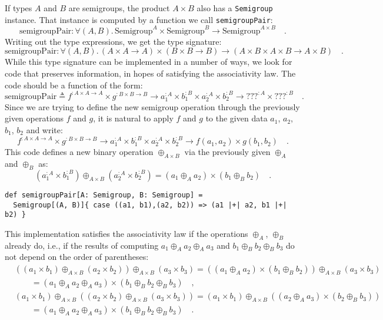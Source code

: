 If types $A$ and $B$ are semigroups, the product $A\times B$ also
has a \lstinline!Semigroup! instance. That instance is computed by
a function we call \lstinline!semigroupPair!:
\[
\text{semigroupPair}:\forall(A,B).\,\text{Semigroup}^{A}\times\text{Semigroup}^{B}\rightarrow\text{Semigroup}^{A\times B}\quad.
\]
Writing out the type expressions, we get the type signature:
\[
\text{semigroupPair}:\forall(A,B).\,\left(A\times A\rightarrow A\right)\times\left(B\times B\rightarrow B\right)\rightarrow\left(A\times B\times A\times B\rightarrow A\times B\right)\quad.
\]
While this type signature can be implemented in a number of ways,
we look for code that preserves information, in hopes of satisfying
the associativity law. The code should be a function of the form:
\[
\text{semigroupPair}\triangleq f^{:A\times A\rightarrow A}\times g^{:B\times B\rightarrow B}\rightarrow a_{1}^{:A}\times b_{1}^{:B}\times a_{2}^{:A}\times b_{2}^{:B}\rightarrow???^{:A}\times???^{:B}\quad.
\]
Since we are trying to define the new semigroup operation through
the previously given operations $f$ and $g$, it is natural to apply
$f$ and $g$ to the given data $a_{1}$, $a_{2}$, $b_{1}$, $b_{2}$
and write:
\[
f^{:A\times A\rightarrow A}\times g^{:B\times B\rightarrow B}\rightarrow a_{1}^{:A}\times b_{1}^{:B}\times a_{2}^{:A}\times b_{2}^{:B}\rightarrow f(a_{1},a_{2})\times g(b_{1},b_{2})\quad.
\]
This code defines a new binary operation $\oplus_{A\times B}$ via
the previously given $\oplus_{A}$ and $\oplus_{B}$ as:
\begin{equation}
(a_{1}^{:A}\times b_{1}^{:B})\oplus_{A\times B}(a_{2}^{:A}\times b_{2}^{:B})=(a_{1}\oplus_{A}a_{2})\times(b_{1}\oplus_{B}b_{2})\quad.\label{eq:semigroup-product-operation-def}
\end{equation}
\begin{lstlisting}
def semigroupPair[A: Semigroup, B: Semigroup] =
  Semigroup[(A, B)]{ case ((a1, b1),(a2, b2)) => (a1 |+| a2, b1 |+| b2) }
\end{lstlisting}
This implementation satisfies the associativity law if the operations
$\oplus_{A}$, $\oplus_{B}$ already do, i.e., if the results of computing
$a_{1}\oplus_{A}a_{2}\oplus_{A}a_{3}$ and $b_{1}\oplus_{B}b_{2}\oplus_{B}b_{3}$
do not depend on the order of parentheses:
\begin{align*}
 & \left(\left(a_{1}\times b_{1}\right)\oplus_{A\times B}\left(a_{2}\times b_{2}\right)\right)\oplus_{A\times B}\left(a_{3}\times b_{3}\right)=\left((a_{1}\oplus_{A}a_{2})\times(b_{1}\oplus_{B}b_{2})\right)\oplus_{A\times B}\left(a_{3}\times b_{3}\right)\\
 & \quad\quad=\left(a_{1}\oplus_{A}a_{2}\oplus_{A}a_{3}\right)\times\left(b_{1}\oplus_{B}b_{2}\oplus_{B}b_{3}\right)\quad,\\
 & \left(a_{1}\times b_{1}\right)\oplus_{A\times B}\left(\left(a_{2}\times b_{2}\right)\oplus_{A\times B}\left(a_{3}\times b_{3}\right)\right)=\left(a_{1}\times b_{1}\right)\oplus_{A\times B}\left((a_{2}\oplus_{A}a_{3})\times(b_{2}\oplus_{B}b_{3})\right)\\
 & \quad\quad=\left(a_{1}\oplus_{A}a_{2}\oplus_{A}a_{3}\right)\times\left(b_{1}\oplus_{B}b_{2}\oplus_{B}b_{3}\right)\quad.
\end{align*}


